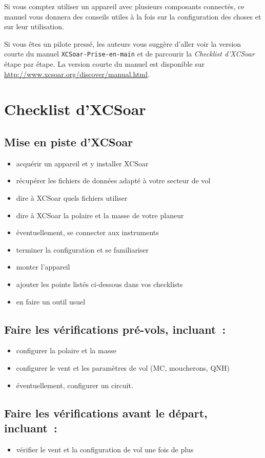 Si vous comptez utiliser un appareil avec plusieurs composants connectés,
ce manuel vous donnera des conseils utiles à la fois sur la configuration des choses et sur
leur utilisation.

Si vous êtes un pilote pressé, les auteurs vous suggère d'aller voir la version courte
du manuel \texttt{XCSoar-Prise-en-main} et de parcourir la \emph{Checklist d'XCSoar}
étape par étape. La version courte du manuel est disponible sur \url{http://www.xcsoar.org/discover/manual.html}.

\section{Checklist d'XCSoar}

\subsection*{{Mise en piste d'XCSoar}}
\begin{itemize}
\item acquérir un appareil et y installer XCSoar
\item récupérer les fichiers de données adapté à votre secteur de vol
\item dire à XCSoar quels fichiers utiliser
\item dire à XCSoar la polaire et la masse de votre planeur
\item éventuellement, se connecter aux instruments
\item terminer la configuration et se familiariser
\item monter l'appareil
\item ajouter les points listés ci-dessous dans vos checklists
\item en faire un outil usuel
\end{itemize}

\subsection*{Faire les vérifications pré-vols, incluant~:}
\begin{itemize}
\item configurer la polaire et la masse
\item configurer le vent et les paramètres de vol (MC, moucherons, QNH)
\item éventuellement, configurer un circuit.
\end{itemize}

\subsection*{Faire les vérifications avant le départ, incluant~:}
\begin{itemize}
\item vérifier le vent et la configuration de vol une fois de plus
\end{itemize}
\vspace{2em}

